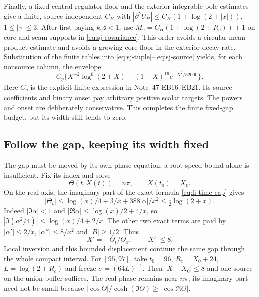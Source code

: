 Finally, a fixed central regulator floor and the exterior integrable
pole estimates give a finite, source-independent $C_H$ with
$|\partial^\gamma U_H|\le C_H(1+\log(2+|x|))$, $1\le|\gamma|\le3$.
After first paying $k_\gamma\mathfrak s<1$, use
$M_\gamma=C_H(1+\log(2+R_c))+1$ on core and seam supports in
\eqref{eq:sj-covariance}. This order avoids a circular mean-product
estimate and avoids a growing-core floor in the exterior decay rate.
Substitution of the finite tables into
\eqref{eq:sj-tuple}--\eqref{eq:sj-source} yields, for each nonsource
column, the envelope
\begin{equation}
 C_\eta\{X^{-2}\log^6(2+X)+(1+X)^{16}e^{-X^2/32000}\}.
 \label{eq:ua-fixed-budget}
\end{equation}
Here $C_\eta$ is the explicit finite expression in Note~47 EB16--EB21.
Its source coefficients and binary onset pay arbitrary positive scalar
targets. The powers and onset are deliberately conservative. This
completes the finite fixed-gap budget, but its width still tends to zero.

\subsection{Follow the gap, keeping its width fixed}
The gap must be moved by its own phase equation; a root-speed bound
alone is insufficient. Fix its index and solve
\begin{equation}
 \Theta(t,X(t))=n\pi,\qquad X(t_0)=X_0.
 \label{eq:ua-moving-gap}
\end{equation}
On the real axis, the imaginary part of the exact formula
\eqref{eq:fi-time-cap} gives
\[
 |\Theta_t|\le\log(x)/4+3/x+388|\alpha|/x^2
              \le\tfrac12\log(2+x).
\]
Indeed $|\Im\alpha|<1$ and $|\Re\alpha|\le\log(x)/2+4/x$,
so $|\Im(\alpha^2/4)|\le\log(x)/4+2/x$. The other two exact
terms are paid by $|\alpha'|\le2/x$, $|\alpha''|\le8/x^2$ and
$|B|\ge1/2$. Thus
\begin{equation}
 X'=-\Theta_t/\Theta_x,\qquad |X'|\le8.
 \label{eq:ua-speed}
\end{equation}
Local inversion and this bounded displacement continue the same gap
through the whole compact interval. For $[95,97]$, take $t_0=96$,
$R_c=X_0+24$, $L=\log(2+R_c)$ and freeze $\sigma=(64L)^{-1}$.
Then $|X-X_0|\le8$ and one source on the union buffer suffices.
The real phase remains near $n\pi$; its imaginary part need not be
small because $|\cos\Theta|/\cosh(\Im\Theta)\ge|\cos\Re\Theta|$.


